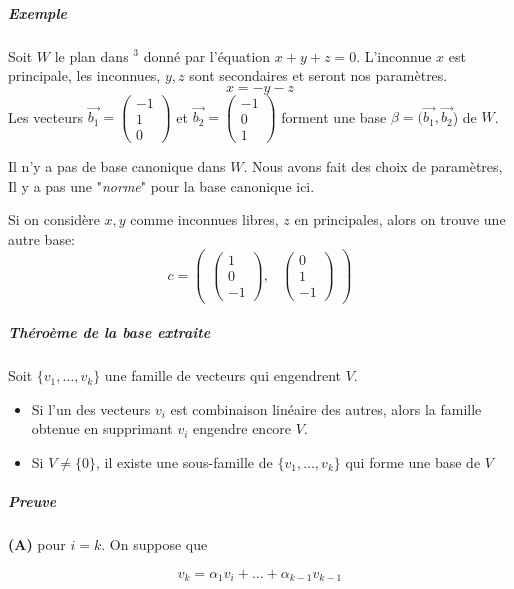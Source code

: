 \subparagraph{Exemple}
Soit $W$ le plan dans \R$^3$ donné par l'équation $x + y + z = 0$. L'inconnue $x$ est principale, les inconnues, $y, z$ sont secondaires et seront nos paramètres.
\[x = -y -z\]
Les vecteurs $\vec{b_1} = \begin{pmatrix}
    -1 \\ 1 \\ 0
\end{pmatrix}$ et $\vec{b_2} =  \begin{pmatrix}
    -1 \\ 0  \\1
\end{pmatrix}$ forment une base $\beta = (\vec{b_1}, \vec{b_2}$) de $W$.
\begin{framedremark}
    Il n'y a pas de base canonique dans $W$. Nous avons fait des choix de paramètres, Il y a pas une "\textit{norme}" pour la base canonique ici.
\end{framedremark}
\begin{exemple}
    Si on considère $x, y$ comme inconnues libres, $z$ en principales, alors on trouve une autre base:
    \[c = \begin{pmatrix}
        
    \begin{pmatrix}
        1 \\ 0 \\ -1
    \end{pmatrix}, & \begin{pmatrix}
        0 \\ 1 \\ -1
    \end{pmatrix}\end{pmatrix}\]
\end{exemple}
\subparagraph{Théroème de la base extraite}
Soit $\{v_1, \dots, v_k\}$ une famille de vecteurs qui engendrent $V$.
\begin{theoreme}
    \begin{itemize}
        \item Si l'un des vecteurs $v_i$ est combinaison linéaire des autres, alors la famille obtenue en supprimant $v_i$ engendre encore $V$.
        \item Si $V \neq \{0\}$, il existe une sous-famille de $\{v_1, \dots, v_k\}$ qui forme une base de $V$
    \end{itemize}
\end{theoreme}
\subparagraph{Preuve} \textbf{(A)} pour $i = k$. On suppose que
\begin{formule}
    \[v_k = \alpha_1v_i + \dots + \alpha_{k-1}v_{k-1}\]
\end{formule}
